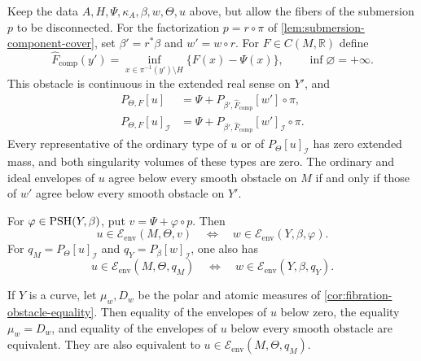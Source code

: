 \begin{corollary}\label{cor:fibration-component-cover}
Keep the data $A,H,\Psi,\kappa_A,\beta,w,\Theta,u$ above, but allow the fibers of the submersion $p$ to be disconnected. For the factorization $p=r\circ\pi$ of \cref{lem:submersion-component-cover}, set $\beta'=r^*\beta$ and $w'=w\circ r$. For $F\in C(M,\mathbb R)$ define
\[
 \widehat F_{\mathrm{comp}}(y')
   =\inf_{x\in\pi^{-1}(y')\setminus H}\{F(x)-\Psi(x)\},
 \qquad\inf\varnothing=+\infty.
\]
This obstacle is continuous in the extended real sense on $Y'$, and
\[
 \begin{split}
 P_{\Theta,F}[u]
   &=\Psi+P_{\beta',\widehat F_{\mathrm{comp}}}[w']\circ\pi,\\
 P_{\Theta,F}[u]_{\mathcal I}
   &=\Psi+P_{\beta',\widehat F_{\mathrm{comp}}}[w']_{\mathcal I}\circ\pi.
 \end{split}
\]
Every representative of the ordinary type of $u$ or of $P_\Theta[u]_{\mathcal I}$ has zero extended mass, and both singularity volumes of these types are zero. The ordinary and ideal envelopes of $u$ agree below every smooth obstacle on $M$ if and only if those of $w'$ agree below every smooth obstacle on $Y'$.

For $\varphi\in\mathrm{PSH}(Y,\beta)$, put $v=\Psi+\varphi\circ p$. Then
\[
 u\in\mathcal E_{\mathrm{env}}(M,\Theta,v)
 \quad\Longleftrightarrow\quad
 w\in\mathcal E_{\mathrm{env}}(Y,\beta,\varphi).
\]
For $q_M=P_\Theta[u]_{\mathcal I}$ and $q_Y=P_\beta[w]_{\mathcal I}$, one also has
\[
 u\in\mathcal E_{\mathrm{env}}(M,\Theta,q_M)
 \quad\Longleftrightarrow\quad
 w\in\mathcal E_{\mathrm{env}}(Y,\beta,q_Y).
\]

If $Y$ is a curve, let $\mu_w,D_w$ be the polar and atomic measures of \cref{cor:fibration-obstacle-equality}. Then equality of the envelopes of $u$ below zero, the equality $\mu_w=D_w$, and equality of the envelopes of $u$ below every smooth obstacle are equivalent.
They are also equivalent to $u\in\mathcal E_{\mathrm{env}}(M,\Theta,q_M)$.
\end{corollary}
